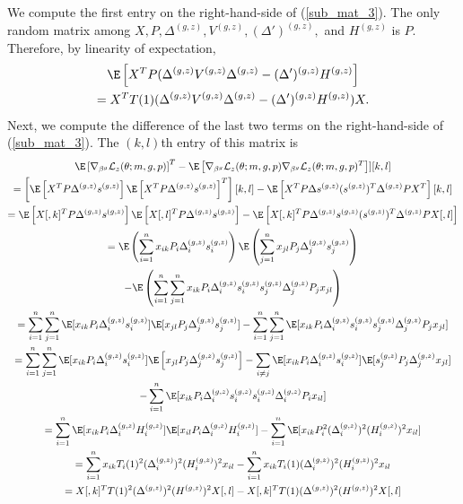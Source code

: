 \documentclass[12pt]{article}
\begin{document}
We compute the first entry on the right-hand-side of (\ref{sub_mat_3}). The only random matrix among $X, P, \Delta^{(g,z)}, V^{(g,z)}, (\Delta')^{(g,z)},$ and $H^{(g,z)}$ is $P$. Therefore, by linearity of expectation,
\begin{multline*}
\E \left[ X^T P (\Delta^{(g,z)}V^{(g,z)}\Delta^{(g,z)} - (\Delta')^{(g,z)} H^{(g,z)} \right] \\ = X^T T(1) ( \Delta^{(g,z)}V^{(g,z)}\Delta^{(g,z)} - (\Delta')^{(g,z)} H^{(g,z)}) X.
\end{multline*}
Next, we compute the difference of the last two terms on the right-hand-side of (\ref{sub_mat_3}). The $(k,l)$th entry of this matrix is
\begin{multline*}
[ \E \left[ \nabla_{\beta^g} \mathcal{L}_z(\theta; m, g, p) \right] \E \left[ \nabla_{\beta^g} \mathcal{L}_z(\theta; m, g, p) \right]^T - \E \left[ \nabla_{\beta^g} \mathcal{L}_z(\theta; m, g, p) \nabla_{\beta^g} \mathcal{L}_z(\theta; m, g, p)^T \right] ][k,l] \\ 
= \left[ \E \left[ {X}^T P \Delta^{(g,z)} s^{(g,z)} \right]\E \left[ {X}^T P \Delta^{(g,z)} s^{(g,z)} \right]^T\right][k,l] - \E \left[ {X}^T P \Delta s^{(g,z)} (s^{(g,z)})^T \Delta^{(g,z)} P {X}^T \right][k,l] \\ 
= \E\left[{X}[,k]^T P \Delta^{(g,z)} s^{(g,z)} \right] \E \left[ {X}[,l]^T P \Delta^{(g,z)} s^{(g,z)} \right] - \E \left[ {X}[,k]^T P \Delta^{(g,z)} s^{(g,z)} (s^{(g,z)})^T \Delta^{(g,z)} P {X}[,l ] \right] \\
=\E\left(\sum_{i=1}^n {x}_{ik} P_i \Delta^{(g,z)}_i s^{(g,z)}_{i} \right) \E \left( \sum_{j=1}^n {x}_{jl} P_j \Delta^{(g,z)}_j s^{(g,z)}_j \right) \\ - \E \left( \sum_{i=1}^n \sum_{j=1}^n {x}_{ik} P_i \Delta^{(g,z)}_i s^{(g,z)}_i s^{(g,z)}_j \Delta^{(g,z)}_j P_j{x}_{jl} \right) \\ 
= \sum_{i=1}^n \sum_{j=1}^n \E[ {x}_{ik} P_i \Delta^{(g,z)}_is^{(g,z)}_i] \E [ {x}_{jl} P_j \Delta^{(g,z)}_j s^{(g,z)}_j]  -  \sum_{i=1}^n \sum_{j=1}^n \E [ {x}_{ik} P_i \Delta^{(g,z)}_i s^{(g,z)}_i s^{(g,z)}_j \Delta^{(g,z)}_jP_j {x}_{jl}  ]  \\
= \sum_{i=1}^n \sum_{j=1}^n \E[ {x}_{ik} P_i \Delta^{(g,z)}_i s^{(g,z)}_i ] \E \left[{x}_{jl} P_j \Delta^{(g,z)}_j s^{(g,z)}_j \right]  - \sum_{i \neq j} \E [{x}_{ik} P_i \Delta^{(g,z)}_i s^{(g,z)}_i] \E[s^{(g,z)}_j P_j \Delta^{(g,z)}_j {x}_{jl}] \\ - \sum_{i=1}^n \E[ {x}_{ik}P_i \Delta^{(g,z)}_i s^{(g,z)}_i s^{(g,z)}_i \Delta^{(g,z)}_i P_i{x}_{il}] \\ 
= \sum_{i=1}^n \E[ {x}_{ik} P_i \Delta^{(g,z)}_i H^{(g,z)}_i] \E[{x}_{il}P_i\Delta^{(g,z)}_i H^{(g,z)}_i] - \sum_{i=1}^n \E[{x}_{ik}P_i^2(\Delta^{(g,z)}_i)^2 (H^{(g,z)}_i)^2 {x}_{il}] \\ = \sum_{i=1}^n {x}_{ik} T_i(1)^2(\Delta^{(g,z)}_i)^2 (H_i^{(g,z)})^2{x}_{il} - \sum_{i=1}^n {x}_{ik} T_i(1) (\Delta_i^{(g,z)})^2 (H_i^{(g,z)})^2 {x}_{il} \\ = {X}[,k]^T T(1)^2 (\Delta^{(g,z)})^2 (H^{(g,z)})^2 {X}[,l] - {X}[,k]^T T(1) (\Delta^{(g,z)})^2 (H^{(g,z)})^2 {X}[,l]
\end{multline*}
\end{document}

